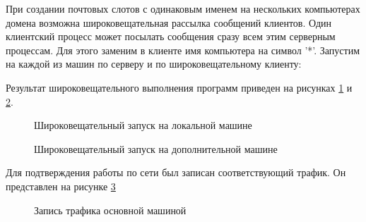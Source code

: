 \documentclass[a4paper]{article}
\begin{document}
	При создании почтовых слотов с одинаковым именем на нескольких компьютерах домена возможна широковещательная рассылка сообщений клиентов. Один клиентский процесс может посылать сообщения сразу всем этим серверным процессам. Для этого заменим в клиенте имя компьютера на символ '*'. Запустим на каждой из машин по серверу и по широковещательному клиенту:
	
		Результат широковещательного выполнения программ приведен на рисунках \ref{img:task9_broad_local} и \ref{img:task9_broad_remote}.
	\begin{figure}[h!]
		\caption{Широковещательный запуск на локальной машине}
		\label{img:task9_broad_local}
	\end{figure}

	\begin{figure}[h!]
		\caption{Широковещательный запуск на дополнительной машине}
		\label{img:task9_broad_remote}
	\end{figure}
	
	Для подтверждения работы по сети был записан соответствующий трафик. Он представлен на рисунке \ref{img:task9_broad_wire}
	
	\begin{figure}[h!]
		\caption{Запись трафика основной машиной}
		\label{img:task9_broad_wire}
	\end{figure}
\end{document}
